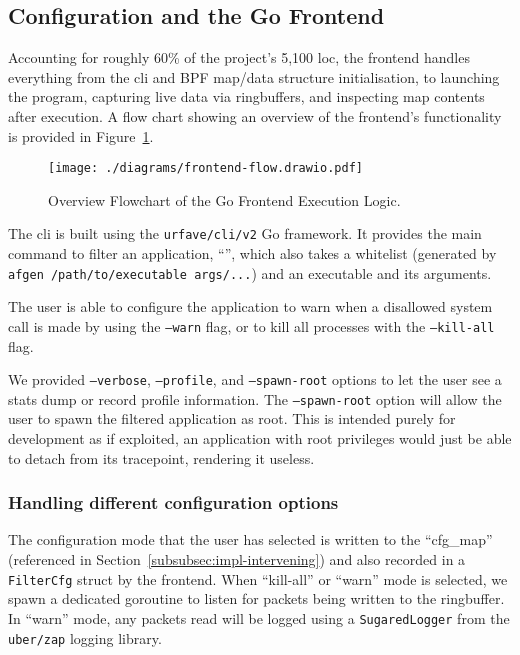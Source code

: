\subsection{Configuration and the Go Frontend}\label{subsec:impl-frontend}

Accounting for roughly 60\% of the project's 5,100 \ac{loc}, the frontend handles 
everything from the \ac{cli} and BPF  map/data structure initialisation, to 
launching the program, capturing live data via ringbuffers, and inspecting 
map contents after execution. A flow chart showing an overview of the frontend's
functionality is provided in Figure~\ref{fig:frontend-flowchart}.

\begin{figure}[h]
\centering
\texttt{[image: ./diagrams/frontend-flow.drawio.pdf]}
\caption{Overview Flowchart of the Go Frontend Execution Logic.}
\label{fig:frontend-flowchart}
\end{figure}

The \ac{cli} is built using the \texttt{urfave/cli/v2} Go framework. It provides
the main command to filter an application, ``\af'', which also takes a whitelist
(generated by \texttt{afgen /path/to/executable args/...}) and an
executable and its arguments. 

The user is able to configure the application to warn when a disallowed system call
is made by using the \texttt{--warn} flag, or to kill all processes with the
\texttt{--kill-all} flag. 

We provided \texttt{--verbose}, \texttt{--profile}, and \texttt{--spawn-root}
options to let the user see a stats dump or record profile information. The
\texttt{--spawn-root} option will allow the user to spawn the filtered
application as root. This is intended purely for development as if exploited,
an application with root privileges would just be able to detach \af from its
tracepoint, rendering it useless.


\subsubsection{Handling different configuration options}

The configuration mode that the user has selected is written to the
``cfg\_map'' (referenced in Section~\ref{subsubsec:impl-intervening}) and also
recorded in a \texttt{FilterCfg} struct by the frontend. When ``kill-all'' or
``warn'' mode is selected, we spawn a dedicated goroutine to listen for packets
being written to the ringbuffer. In ``warn'' mode, any packets read will be
logged using a \texttt{SugaredLogger} from the \texttt{uber/zap} logging
library. 

